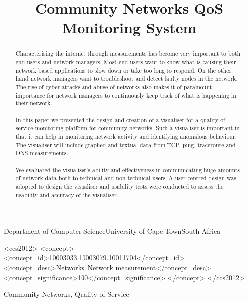\documentclass[plain]{sigplanconf}
\begin{document}
	\title{Community Networks QoS Monitoring System}

	{Department of Computer Science\linebreak University of Cape Town\linebreak South Africa}
	{}
	\maketitle

	\begin{abstract}
	\paragraph{}
	Characterising the internet through measurements has become very important to both end users and network
	managers. Most end users want to know what is causing their network based applications to slow down or take too long to respond. On the other hand network managers want to troubleshoot and detect faulty nodes in the network. The rise of cyber attacks and abuse of networks also makes it of paramount importance for network managers to continuously keep track of what is happening in their network.
	\paragraph{}
	In this paper we presented the design and creation of a visualiser for a quality of service monitoring platform for community networks. Such a visualiser is important in that it can help in monitoring network activity and identifying anomalous behaviour. The visualiser will include graphed and textual data from TCP, ping, traceroute and DNS measurements.
	\paragraph{}
	We evaluated the visualiser's ability and effectiveness in communicating huge amounts of network data both to technical and non-technical users. A user centred design was adopted to design the visualiser and usability tests were conducted to assess the usability and accuracy of the visualiser.
	\paragraph{}
	
	\end{abstract}
	\begin{CCSXML}
		<ccs2012>
		<concept>
		<concept_id>10003033.10003079.10011704</concept_id>
		<concept_desc>Networks~Network measurement</concept_desc>
		<concept_significance>100</concept_significance>
		</concept>
		</ccs2012>
	\end{CCSXML}
	\keywords
	Community Networks, Quality of Service
	








	
	
%	
\end{document}
